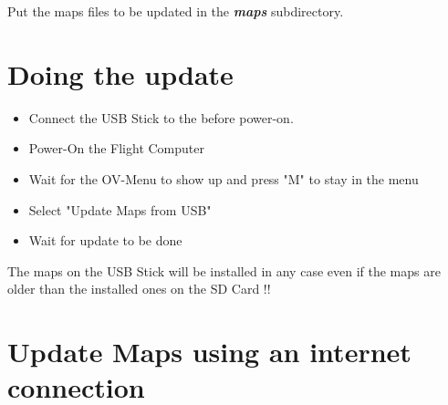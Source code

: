 Put the maps files to be updated in the \textsl{\textbf{maps}} subdirectory.

\section{Doing the update}
\begin{itemize}
	\item Connect the USB Stick to the \ovfc before power-on.
	\item Power-On the Flight Computer
	\item Wait for the OV-Menu to show up and press "M" to stay in the menu
	\item Select "Update Maps from USB"
	\item Wait for update to be done
\end{itemize}

\warning The maps on the USB Stick will be installed in any case even if the maps 
are older than the installed ones on the SD Card !!

\section{Update Maps using an internet connection}


\begin{quote}
\ovwebsite{}
\end{quote}